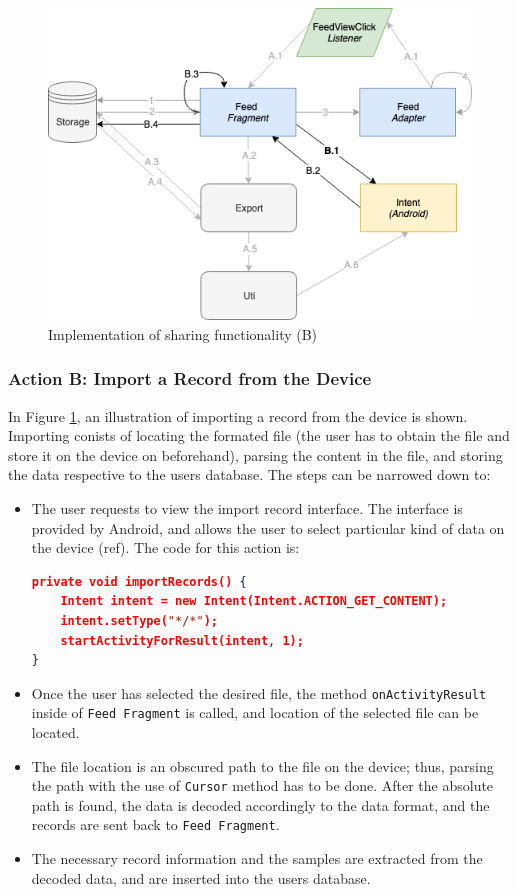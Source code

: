 \begin{figure}
    \centering
    \includegraphics[scale=0.6]{images/Sharing_ImpB.png}
    \caption{Implementation of sharing functionality (B)}
    \label{fig:impl_sharingB}
\end{figure}

\subsubsection{Action B: Import a Record from the Device}
In Figure \ref{fig:impl_sharingB}, an illustration of importing a record from the device is shown. Importing conists of locating the formated file (the user has to obtain the file and store it on the device on beforehand), parsing the content in the file, and storing the data respective to the users database. The steps can be narrowed down to:

\begin{itemize}
    \item[B.1] The user requests to view the import record interface. The interface is provided by Android, and allows the user to select particular kind of data on the device (ref). The code for this action is:
\begin{lstlisting}[language=json, caption={My Caption}, captionpos=b]
private void importRecords() {
    Intent intent = new Intent(Intent.ACTION_GET_CONTENT);
    intent.setType("*/*");
    startActivityForResult(intent, 1);
}

\end{lstlisting}
    \item[B.2] Once the user has selected the desired file, the method \verb|onActivityResult| inside of \verb|Feed Fragment| is called, and location of the selected file can be located. 
    \item[B.3] The file location is an obscured path to the file on the device; thus, parsing the path with the use of \verb|Cursor| method has to be done. After the absolute path is found, the data is decoded accordingly to the data format, and the records are sent back to \verb|Feed Fragment|.
    \item[B.4] The necessary record information and the samples are extracted from the decoded data, and are inserted into the users database. 
\end{itemize}

